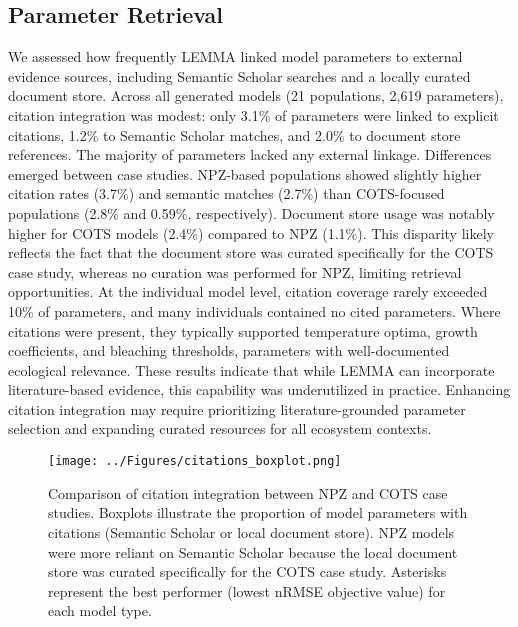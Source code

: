 \subsection{Parameter Retrieval}
\label{sec:citations_analysis}
We assessed how frequently LEMMA linked model parameters to external evidence sources, including Semantic Scholar searches and a locally curated document store. Across all generated models (21 populations, 2,619 parameters), citation integration was modest: only 3.1\% of parameters were linked to explicit citations, 1.2\% to Semantic Scholar matches, and 2.0\% to document store references. The majority of parameters lacked any external linkage.
Differences emerged between case studies. NPZ-based populations showed slightly higher citation rates (3.7\%) and semantic matches (2.7\%) than COTS-focused populations (2.8\% and 0.59\%, respectively). Document store usage was notably higher for COTS models (2.4\%) compared to NPZ (1.1\%). This disparity likely reflects the fact that the document store was curated specifically for the COTS case study, whereas no curation was performed for NPZ, limiting retrieval opportunities.
At the individual model level, citation coverage rarely exceeded 10\% of parameters, and many individuals contained no cited parameters. Where citations were present, they typically supported temperature optima, growth coefficients, and bleaching thresholds, parameters with well-documented ecological relevance. These results indicate that while LEMMA can incorporate literature-based evidence, this capability was underutilized in practice. Enhancing citation integration may require prioritizing literature-grounded parameter selection and expanding curated resources for all ecosystem contexts.
\begin{figure}[H]
\centering
\texttt{[image: ../Figures/citations\_boxplot.png]}
\caption{Comparison of citation integration between NPZ and COTS case studies. Boxplots illustrate the proportion of model parameters with citations (Semantic Scholar or local document store). NPZ models were more reliant on Semantic Scholar because the local document store was curated specifically for the COTS case study. Asterisks represent the best performer (lowest nRMSE objective value) for each model type.}
\label{fig:citations_boxplot}
\end{figure}